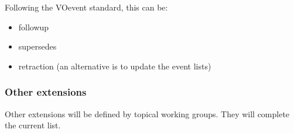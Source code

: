 \documentclass[11pt,a4paper]{ivoa}
\begin{document}
Following the VOevent standard, this can be:

\begin{itemize}

\item followup

\item supersedes

\item retraction (an alternative is to update the event lists)

\end{itemize}

\subsubsection{Other extensions}

Other extensions will be defined by topical working groups. They will complete the current list.



\end{document}
